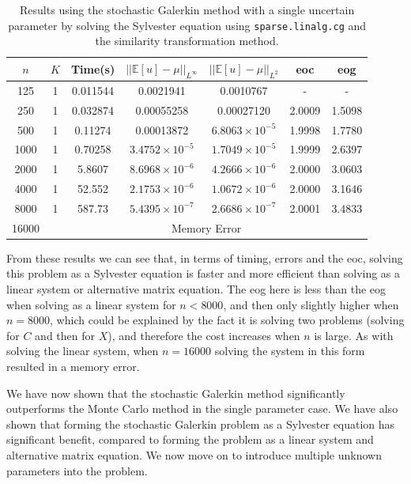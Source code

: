 \documentclass[11pt]{article}
\numberwithin{equation}{section}
\begin{document}
\begin{table}[H]
\centering
\begin{tabular}{|c|c|c|c|c|c|c|}
\hline
$n$ & $K$ & Time(s) & $|| \mathbb{E}[u] - \mu ||_{L^{\infty}}$ & $|| \mathbb{E}[u] - \mu ||_{L^{2}}$ & eoc & eog \\
\hline
125 & 1 & 0.011544 & 0.0021941 & 0.0010767 & - & - \\
250 & 1 & 0.032874 & 0.00055258 &  0.00027120 & 2.0009 & 1.5098 \\
500 & 1 & 0.11274 & 0.00013872 & $6.8063 \times 10^{-5}$ & 1.9998 & 1.7780 \\
1000 & 1 &  0.70258 & $3.4752 \times 10^{-5}$ & $1.7049 \times 10^{-5}$ & 1.9999 & 2.6397 \\
2000 & 1 & 5.8607 & $8.6968 \times 10^{-6}$ & $4.2666 \times 10^{-6}$ & 2.0000 & 3.0603 \\
4000 & 1 & 52.552 & $2.1753 \times 10^{-6}$ & $1.0672 \times 10^{-6}$ & 2.0000 & 3.1646 \\
8000 & 1 & 587.73 & $5.4395 \times 10^{-7}$ & $2.6686 \times 10^{-7}$ & 2.0001 & 3.4833 \\
\cline{2-7}
16000 & \multicolumn{6}{c|}{Memory Error} \\
\hline
\end{tabular}
\captionsetup{justification=centering}
\caption{Results using the stochastic Galerkin method with a single uncertain parameter by solving the Sylvester equation using \texttt{sparse.linalg.cg} and the similarity transformation method.}
\label{table:stochastic sylvester}
\end{table}

From these results we can see that, in terms of timing, errors and the eoc, solving this problem as a Sylvester equation is faster and more efficient than solving as a linear system or alternative matrix equation. The eog here is less than the eog when solving as a linear system for $n<8000$, and then only slightly higher when $n=8000$, which could be explained by the fact it is solving two problems (solving for $C$ and then for $X$), and therefore the cost increases when $n$ is large. As with solving the linear system, when $n=16000$ solving the system in this form resulted in a memory error. 

We have now shown that the stochastic Galerkin method significantly outperforms the Monte Carlo method in the single parameter case. We have also shown that forming the stochastic Galerkin problem as a Sylvester equation has significant benefit, compared to forming the problem as a linear system and alternative matrix equation. We now move on to introduce multiple unknown parameters into the problem.
\end{document}
